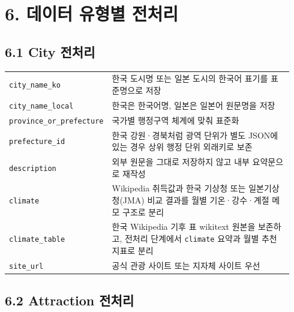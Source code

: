 \documentclass[12pt,a4paper]{article}
\newcommand{\DocNeedspace}[1]{\par\ifdim\dimexpr\pagegoal-\pagetotal\relax<#1\newpage\fi}
\begin{document}
\newpage

\DocNeedspace{10\baselineskip}
\section*{6. 데이터 유형별 전처리}


\DocNeedspace{8\baselineskip}
\subsection*{6.1 City 전처리}


\DocNeedspace{22\baselineskip}
\begin{small}
\begin{longtable}{@{}>{\RaggedRight\arraybackslash}m{0.279\linewidth}>{\RaggedRight\arraybackslash}m{0.661\linewidth}@{}}
\toprule
\multicolumn{1}{>{\centering\arraybackslash}m{0.279\linewidth}}{\textbf{필드}} & \multicolumn{1}{>{\centering\arraybackslash}m{0.661\linewidth}}{\textbf{처리 기준}} \\
\midrule
\endhead
\texttt{city\_\allowbreak{}name\_\allowbreak{}ko} & 한국 도시명 또는 일본 도시의 한국어 표기를 표준명으로 저장 \\
\texttt{city\_\allowbreak{}name\_\allowbreak{}local} & 한국은 한국어명, 일본은 일본어 원문명을 저장 \\
\texttt{province\_\allowbreak{}or\_\allowbreak{}prefecture} & 국가별 행정구역 체계에 맞춰 표준화 \\
\texttt{prefecture\_\allowbreak{}id} & 한국 강원·경북처럼 광역 단위가 별도 JSON에 있는 경우 상위 행정 단위 외래키로 보존 \\
\texttt{description} & 외부 원문을 그대로 저장하지 않고 내부 요약문으로 재작성 \\
\texttt{climate} & Wikipedia 취득값과 한국 기상청 또는 일본기상청(JMA) 비교 결과를 월별 기온·강수·계절 메모 구조로 분리 \\
\texttt{climate\_\allowbreak{}table} & 한국 Wikipedia 기후 표 wikitext 원본을 보존하고, 전처리 단계에서 \texttt{climate} 요약과 월별 추천 지표로 분리 \\
\texttt{site\_\allowbreak{}url} & 공식 관광 사이트 또는 지자체 사이트 우선 \\
\bottomrule
\end{longtable}
\end{small}


\DocNeedspace{24\baselineskip}
\subsection*{6.2 Attraction 전처리}
\end{document}
